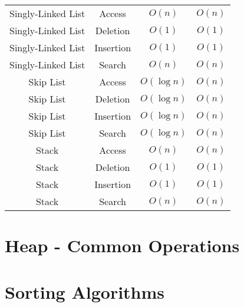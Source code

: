 \documentclass{article}
\begin{document}
\begin{table}[ht]
\begin{tabular}{c ccc}
		Singly-Linked List & Access & $O(n)$ & $O(n)$  \\
		Singly-Linked List & Deletion & $O(1)$ & $O(1)$ \\
		Singly-Linked List & Insertion & $O(1)$ & $O(1)$ \\
		Singly-Linked List & Search & $O(n)$ & $O(n)$ \\
		
		Skip List & Access & $O(\log{n})$ & $O(n)$ \\
		Skip List & Deletion & $O(\log{n})$ & $O(n)$ \\
		Skip List & Insertion & $O(\log{n})$ & $O(n)$ \\
		Skip List & Search & $O(\log{n})$ & $O(n)$ \\
		
		Stack & Access & $O(n)$ & $O(n)$ \\
		Stack & Deletion & $O(1)$ & $O(1)$ \\
		Stack & Insertion & $O(1)$ & $O(1)$ \\
		Stack & Search & $O(n)$ & $O(n)$ \\
		
		\hline
	\end{tabular}
\end{table}


\newpage
\section*{Heap - Common Operations}


\newpage
\section*{Sorting Algorithms}
\end{document}
